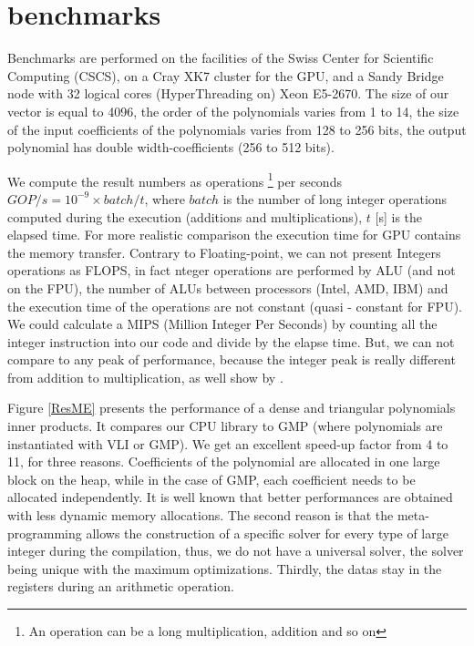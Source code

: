 \documentclass[oribibl]{llncs2e/llncs}
\begin{document}
\section{benchmarks}


Benchmarks are performed on the facilities of the Swiss Center for Scientific Computing (CSCS), on a Cray  XK7 cluster for the GPU, and a Sandy Bridge  node with 32 logical cores  (HyperThreading on) Xeon E5-2670. The size of our vector is equal to 4096, the order of the polynomials varies from 1 to 14, the size of the input coefficients of the polynomials varies from 128 to 256 bits, the output polynomial has double width-coefficients (256 to 512 bits). 

We compute the  result  numbers as operations \footnote{An operation can be a long multiplication, addition and so on}   per seconds $GOP/s=10^{-9} \times batch/t$, where  $batch$ is the number of long integer operations computed during the execution (additions and multiplications), $t$ [s]  is the elapsed time. For more realistic comparison the execution time for GPU contains the memory  transfer. Contrary to Floating-point, we can not present Integers operations as FLOPS, in fact nteger operations are performed by ALU (and not on the FPU),  the number of  ALUs  between processors (Intel, AMD, IBM) and the execution time of the operations are  not constant \cite{ASMcost} (quasi - constant for FPU). We could calculate a MIPS (Million Integer Per Seconds) by counting all the integer instruction into our code and divide by the elapse time. But, we can not compare to any peak of performance, because the integer peak is really different from addition to multiplication, as well show by \cite{Vladimirov2012}. 

Figure \ref{ResME} presents the performance of a dense and triangular polynomials inner products. It compares our CPU library to GMP (where polynomials are  instantiated with VLI or GMP). We get an excellent speed-up factor from 4 to 11, for three reasons.
Coefficients of the  polynomial are allocated in one large block on the heap, while in the case of GMP, each coefficient needs to be allocated independently. It is well known that better performances are obtained with less dynamic memory allocations. The second reason is that  the meta-programming allows the construction of a specific solver for every type of large integer during the compilation, thus, we do not have a universal solver, the solver being unique with the maximum optimizations. Thirdly, the datas stay in the registers during an arithmetic operation.
  
\end{document}
